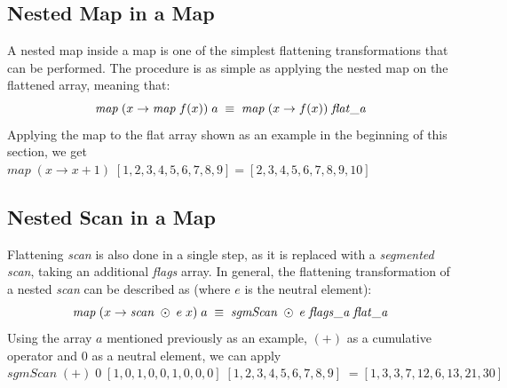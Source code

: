 \subsection{Nested Map in a Map}
\label{chapter:section:flattening:map}
 A nested map inside a map is one of the simplest flattening transformations that can be performed. The procedure is as simple as applying the nested map on the flattened array, meaning that:
\begin{equation}
\centering
\nonumber
\mathit{map}\;(x\rightarrow \mathit{map}\;f(x))\;a\;\equiv\;\mathit{map}\;(x\rightarrow f(x))\;\mathit{flat\_a}
\end{equation}
Applying the map to the flat array shown as an example in the beginning of this section, we get $\mathit{map}\;(x\rightarrow x + 1)\;[1,2,3,4,5,6,7,8,9]=[2,3,4,5,6,7,8,9,10]$

\subsection{Nested Scan in a Map}
\label{chapter:section:flattening:scan}
Flattening \textit{scan} is also done in a single step, as it is replaced with a \textit{segmented scan}, taking an additional \textit{flags} array. In general, the flattening transformation of a nested \textit{scan} can be described as (where $e$ is the neutral element):
\begin{equation}
\centering
\nonumber
\mathit{map}\;(x\rightarrow \mathit{scan}\;\odot\;e\;x)\;a\;
\equiv\;
\mathit{sgmScan}\;\odot\;e\;\mathit{flags\_a}\;\mathit{flat\_a}
\end{equation}
Using the array $a$ mentioned previously as an example, $(+)$ as a cumulative operator and $0$ as a neutral element, we can apply\\ $\mathit{sgmScan}\;(+)\;0\;[1,0,1,0,0,1,0,0,0]\;[1,2,3,4,5,6,7,8,9]\;=[1,3,3,7,12,6,13,21,30]$ 

